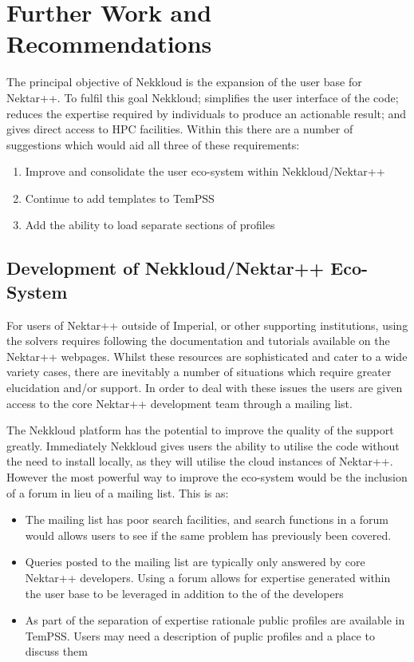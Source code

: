 \documentclass[11pt, a4paper]{report}
\begin{document}
\section{Further Work and Recommendations}
The principal objective of Nekkloud is the expansion of the user base for Nektar++. To fulfil this goal Nekkloud; simplifies the user interface of the code; reduces the expertise required by individuals to produce an actionable result; and gives direct access to HPC facilities. Within this there are a number of suggestions which would aid all three of these requirements:

\begin{enumerate}
\item Improve and consolidate the user eco-system within Nekkloud/Nektar++
\item Continue to add templates to TemPSS
\item Add the ability to load separate sections of profiles
\end{enumerate}

\subsection{Development of Nekkloud/Nektar++ Eco-System}
For users of Nektar++ outside of Imperial, or other supporting institutions, using the solvers requires following the documentation and tutorials available on the Nektar++ webpages. Whilst these resources are sophisticated and cater to a wide variety cases, there are inevitably a number of situations which require greater elucidation and/or support. In order to deal with these issues the users are given access to the core Nektar++ development team through a mailing list.

The Nekkloud platform has the potential to improve the quality of the support greatly. Immediately Nekkloud gives users the ability to utilise the code without the need to install locally, as they will utilise the cloud instances of Nektar++. However the most powerful way to improve the eco-system would be the inclusion of a forum in lieu of a mailing list. This is as:
\begin{itemize}
\item The mailing list has poor search facilities, and search functions in a forum would allows users to see if the same problem has previously been covered.
\item Queries posted to the mailing list are typically only answered by core Nektar++ developers. Using a forum allows for expertise generated within the user base to be leveraged in addition to the of the developers
\item As part of the separation of expertise rationale public profiles are available in TemPSS. Users may need a description of puplic profiles and a place to discuss them
\end{itemize}
\end{document}
